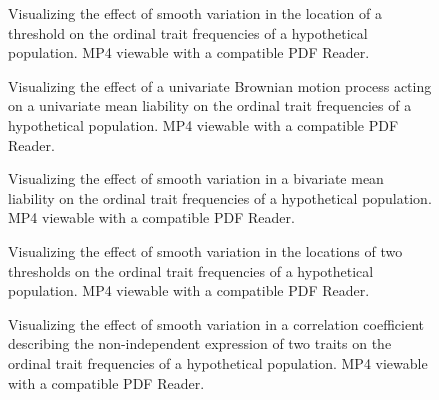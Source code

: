 \begin{figure}[h]
\centering
{}
\caption[Varying the Location of a Threshold Under the Univariate Threshold Model]{Visualizing the effect of smooth variation in the location of a threshold on the ordinal trait frequencies of a hypothetical population. MP4 viewable with a compatible PDF Reader.}
\label{fig:univThreshSmooth}
\end{figure}

\begin{figure}[h]
\centering
{}
\caption[Univariate Brownian Motion Under the Threshold Model]{Visualizing the effect of a univariate Brownian motion process acting on a univariate mean liability on the ordinal trait frequencies of a hypothetical population. MP4 viewable with a compatible PDF Reader.}
\label{fig:univThreshMeanWiggle}
\end{figure}

\begin{figure}[h]
\centering
{}
\caption[Varying the Location of a Population Mean Under the Bivariate Threshold Model]{Visualizing the effect of smooth variation in a bivariate mean liability on the ordinal trait frequencies of a hypothetical population. MP4 viewable with a compatible PDF Reader.}
\label{fig:bivMuSmooth}
\end{figure}

\begin{figure}[h]
\centering
{}
\caption[Varying the Location of Two Thresholds Under the Bivariate Threshold Model]{Visualizing the effect of smooth variation in  the locations of two thresholds on the ordinal trait frequencies of a hypothetical population. MP4 viewable with a compatible PDF Reader.}
\label{fig:bivThreshSmooth}
\end{figure}

\begin{figure}[h]
\centering
{}
\caption[Varying the Location of a Correlation Coefficient Under the Bivariate Threshold Model]{Visualizing the effect of smooth variation in a correlation coefficient describing the non-independent expression of two traits on the ordinal trait frequencies of a hypothetical population. MP4 viewable with a compatible PDF Reader.}
\label{fig:bivCorrSmooth}
\end{figure}

